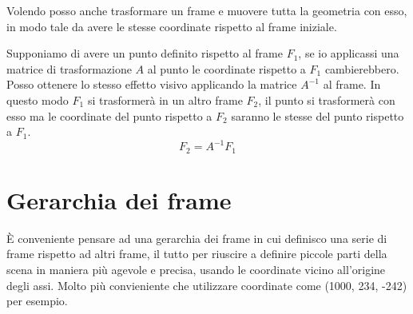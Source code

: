 Volendo posso anche trasformare un frame e muovere tutta la geometria con esso, in modo tale da avere le stesse coordinate
rispetto al frame iniziale.

Supponiamo di avere un punto definito rispetto al frame $F_1$, se io applicassi una matrice di trasformazione $A$ al punto
le coordinate rispetto a $F_1$ cambierebbero. Posso ottenere lo stesso effetto visivo applicando la matrice $A^{-1}$ al
frame. In questo modo $F_1$ si trasformer\`a in un altro frame $F_2$, il punto si trasformer\`a con esso ma le coordinate
del punto rispetto a $F_2$ saranno le stesse del punto rispetto a $F_1$.
\[ F_2 = A^{-1} F_1 \]

\section{Gerarchia dei frame}
\`E conveniente pensare ad una gerarchia dei frame in cui definisco una serie di frame rispetto ad altri frame, il tutto
per riuscire a definire piccole parti della scena in maniera pi\`u agevole e precisa, usando le coordinate vicino
all'origine degli assi. Molto pi\`u convieniente che utilizzare coordinate come (1000, 234, -242) per esempio.